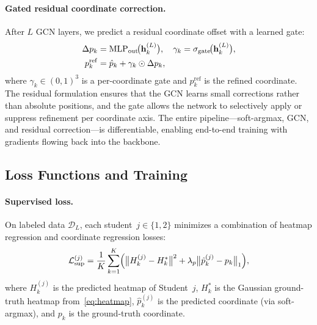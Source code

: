\documentclass[conference]{IEEEtran}
\begin{document}
\paragraph{Gated residual coordinate correction.}
After $L$ GCN layers, we predict a residual coordinate offset with a learned gate:
\begin{align}
  \Delta p_k &= \mathrm{MLP}_{\mathrm{out}}\!\bigl(\mathbf{h}_k^{(L)}\bigr), \quad
  \gamma_k = \sigma_{\mathrm{gate}}\!\bigl(\mathbf{h}_k^{(L)}\bigr), \notag\\
  p_k^{\mathrm{ref}} &= \hat{p}_k + \gamma_k \odot \Delta p_k,
  \label{eq:residual}
\end{align}
where $\gamma_k \in (0,1)^3$ is a per-coordinate gate and $p_k^{\mathrm{ref}}$ is the refined coordinate. The residual formulation ensures that the GCN learns small corrections rather than absolute positions, and the gate allows the network to selectively apply or suppress refinement per coordinate axis. The entire pipeline---soft-argmax, GCN, and residual correction---is differentiable, enabling end-to-end training with gradients flowing back into the backbone.

\subsection{Loss Functions and Training}
\label{sec:loss}

\paragraph{Supervised loss.}
On labeled data $\mathcal{D}_L$, each student~$j \in \{1,2\}$ minimizes a combination of heatmap regression and coordinate regression losses:
\begin{equation}
  \mathcal{L}_{\mathrm{sup}}^{(j)} = \frac{1}{K}\sum_{k=1}^{K}\Bigl(
    \bigl\|H_k^{(j)} - H_k^*\bigr\|^2
    + \lambda_p \bigl\|\hat{p}_k^{(j)} - p_k\bigr\|_1\Bigr),
  \label{eq:loss_sup}
\end{equation}
where $H_k^{(j)}$ is the predicted heatmap of Student~$j$, $H_k^*$ is the Gaussian ground-truth heatmap from~\eqref{eq:heatmap}, $\hat{p}_k^{(j)}$ is the predicted coordinate (via soft-argmax), and $p_k$ is the ground-truth coordinate.
\end{document}
